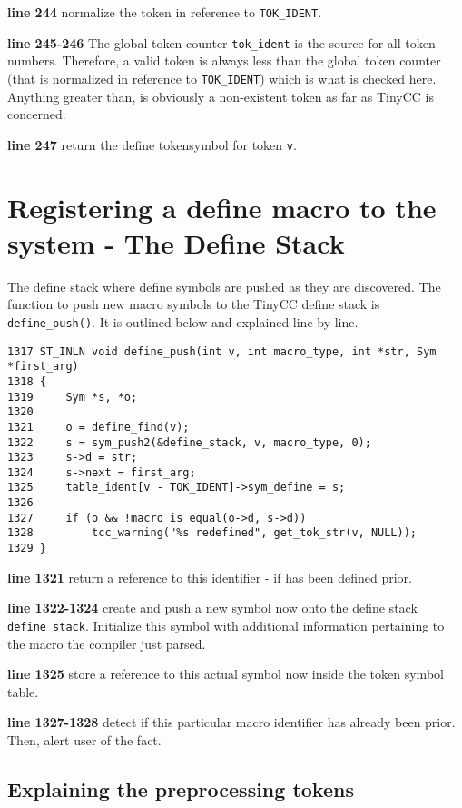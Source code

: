 \begin{tcc_desc}
\textbf{line 244} normalize the token in reference to \verb|TOK_IDENT|.

\textbf{line 245-246} The global token counter \verb|tok_ident| is the source for all token numbers. Therefore, a valid token is always less than the global token counter (that is normalized in reference to \verb|TOK_IDENT|) which is what is checked here. Anything greater than, is obviously a non-existent token as far as TinyCC is concerned.

\textbf{line 247} return the define tokensymbol for token \verb|v|.
\end{tcc_desc}


\section{Registering a define macro to the system - The Define Stack}
The define stack where define symbols are pushed as they are discovered. The function to push new macro symbols to the TinyCC define stack is \verb|define_push()|. It is outlined below and explained line by line.

\begin{verbatim}
1317 ST_INLN void define_push(int v, int macro_type, int *str, Sym *first_arg)
1318 {
1319     Sym *s, *o;
1320
1321     o = define_find(v);
1322     s = sym_push2(&define_stack, v, macro_type, 0);
1323     s->d = str;
1324     s->next = first_arg;
1325     table_ident[v - TOK_IDENT]->sym_define = s;
1326
1327     if (o && !macro_is_equal(o->d, s->d))
1328         tcc_warning("%s redefined", get_tok_str(v, NULL));
1329 }
\end{verbatim}

\begin{tcc_desc}
\textbf{line 1321} return a reference to this identifier - if has been defined prior.

\textbf{line 1322-1324} create and push a new symbol now onto the define stack \verb|define_stack|. Initialize this symbol with additional information pertaining to the macro the compiler just parsed.

\textbf{line 1325} store a reference to this actual symbol now inside the token symbol table.

\textbf{line 1327-1328} detect if this particular macro identifier has already been prior. Then, alert user of the fact.
\end{tcc_desc}


\subsection{Explaining the preprocessing tokens}

